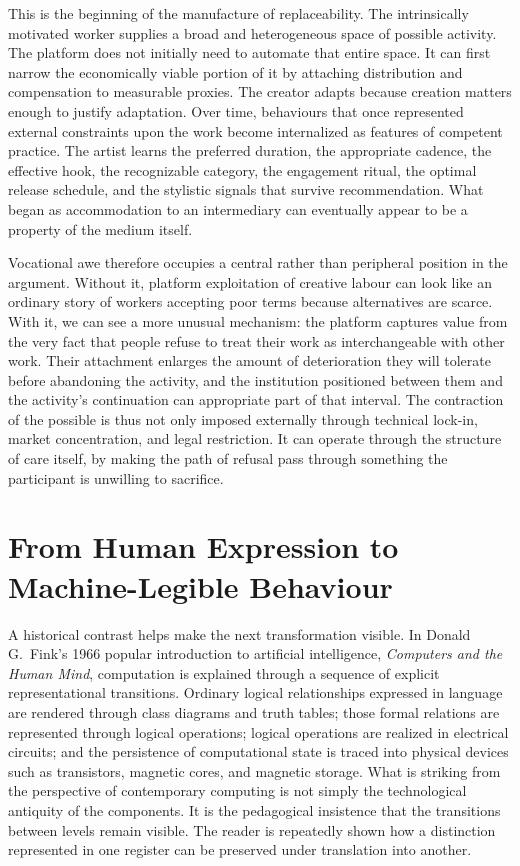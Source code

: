 \documentclass[11pt]{article}
\begin{document}
This is the beginning of the manufacture of replaceability. The intrinsically motivated worker supplies a broad and heterogeneous space of possible activity. The platform does not initially need to automate that entire space. It can first narrow the economically viable portion of it by attaching distribution and compensation to measurable proxies. The creator adapts because creation matters enough to justify adaptation. Over time, behaviours that once represented external constraints upon the work become internalized as features of competent practice. The artist learns the preferred duration, the appropriate cadence, the effective hook, the recognizable category, the engagement ritual, the optimal release schedule, and the stylistic signals that survive recommendation. What began as accommodation to an intermediary can eventually appear to be a property of the medium itself.

Vocational awe therefore occupies a central rather than peripheral position in the argument. Without it, platform exploitation of creative labour can look like an ordinary story of workers accepting poor terms because alternatives are scarce. With it, we can see a more unusual mechanism: the platform captures value from the very fact that people refuse to treat their work as interchangeable with other work. Their attachment enlarges the amount of deterioration they will tolerate before abandoning the activity, and the institution positioned between them and the activity's continuation can appropriate part of that interval. The contraction of the possible is thus not only imposed externally through technical lock-in, market concentration, and legal restriction. It can operate through the structure of care itself, by making the path of refusal pass through something the participant is unwilling to sacrifice.

\section{From Human Expression to Machine-Legible Behaviour}

A historical contrast helps make the next transformation visible. In Donald G.\ Fink's 1966 popular introduction to artificial intelligence, \emph{Computers and the Human Mind}, computation is explained through a sequence of explicit representational transitions. Ordinary logical relationships expressed in language are rendered through class diagrams and truth tables; those formal relations are represented through logical operations; logical operations are realized in electrical circuits; and the persistence of computational state is traced into physical devices such as transistors, magnetic cores, and magnetic storage. What is striking from the perspective of contemporary computing is not simply the technological antiquity of the components. It is the pedagogical insistence that the transitions between levels remain visible. The reader is repeatedly shown how a distinction represented in one register can be preserved under translation into another.
\end{document}
